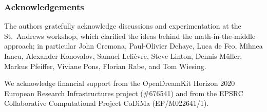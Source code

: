 \documentclass{llncs}
\begin{document}
\subsubsection*{Acknowledgements}
The authors gratefully acknowledge discussions and experimentation at the St.\ Andrews
workshop, which clarified the ideas behind the math-in-the-middle approach;
in particular John Cremona, Paul-Olivier Dehaye, Luca de Feo, Mihnea Iancu, Alexander
Konovalov, Samuel Leli\`evre, Steve Linton, Dennis M\"uller, Markus Pfeiffer, Viviane Pons,
Florian Rabe, and Tom Wiesing.

We acknowledge financial support from the OpenDreamKit Horizon 2020 European Research
Infrastructures project (\#676541) and from the EPSRC Collaborative Computational Project
CoDiMa (EP/M022641/1).

\printbibliography
\end{document}
